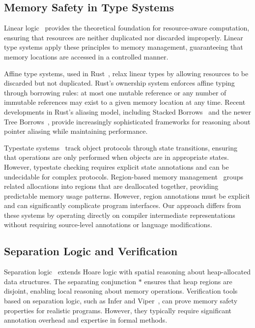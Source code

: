 \documentclass[acmsmall,anonymous,review,screen]{acmart}
\begin{document}
	\subsection{Memory Safety in Type Systems}
	
	Linear logic~\cite{girard1987linear} provides the theoretical foundation for resource-aware computation, ensuring that resources are neither duplicated nor discarded improperly. Linear type systems apply these principles to memory management, guaranteeing that memory locations are accessed in a controlled manner.
	
	Affine type systems, used in Rust~\cite{matsakis2014rust}, relax linear types by allowing resources to be discarded but not duplicated. Rust's ownership system enforces affine typing through borrowing rules: at most one mutable reference or any number of immutable references may exist to a given memory location at any time. Recent developments in Rust's aliasing model, including Stacked Borrows~\cite{jung2020stacked} and the newer Tree Borrows~\cite{villani2025tree}, provide increasingly sophisticated frameworks for reasoning about pointer aliasing while maintaining performance.
	
	Typestate systems~\cite{strom1986typestate} track object protocols through state transitions, ensuring that operations are only performed when objects are in appropriate states. However, typestate checking requires explicit state annotations and can be undecidable for complex protocols. Region-based memory management~\cite{grossman2002region} groups related allocations into regions that are deallocated together, providing predictable memory usage patterns. However, region annotations must be explicit and can significantly complicate program interfaces. Our approach differs from these systems by operating directly on compiler intermediate representations without requiring source-level annotations or language modifications.
	
	\subsection{Separation Logic and Verification}
	
	Separation logic~\cite{reynolds2002separation} extends Hoare logic with spatial reasoning about heap-allocated data structures. The separating conjunction $*$ ensures that heap regions are disjoint, enabling local reasoning about memory operations. Verification tools based on separation logic, such as Infer and Viper~\cite{muller2016viper}, can prove memory safety properties for realistic programs. However, they typically require significant annotation overhead and expertise in formal methods.
	
\end{document}
